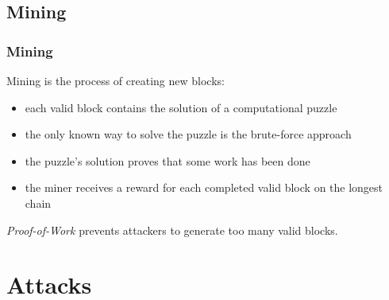 \documentclass[pdf]{beamer}
\begin{document}
\subsection{Mining}
\begin{frame}
	\frametitle{Mining}
	Mining is the process of creating new blocks:
	\begin{itemize}
		\item each valid block contains the solution of a computational puzzle
		\item the only known way to solve the puzzle is the brute-force approach
		\item the puzzle's solution proves that some work has been done
		\item the miner receives a reward for each completed valid block on the longest chain
	\end{itemize}
				
	\par
	\vspace{5mm}
	\textit{Proof-of-Work} prevents attackers to generate too many valid blocks.
\end{frame}

\section{Attacks}
\end{document}
